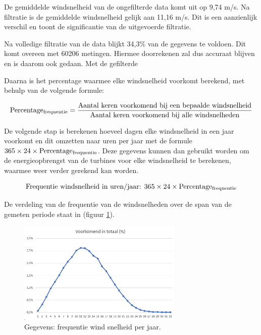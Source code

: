 De gemiddelde windsnelheid van de ongefilterde data komt uit op 9,74 m/s. Na filtratie is de gemiddelde windsnelheid gelijk aan 11,16 m/s. Dit is een aanzienlijk verschil en toont de significantie van de uitgevoerde filtratie.

Na volledige filtratie van de data blijkt 34,3\% van de gegevens te voldoen. Dit komt overeen met 60206 metingen. Hiermee doorrekenen zal dus accuraat blijven en is daarom ook gedaan. Met de gefilterde 

Daarna is het percentage waarmee elke windsnelheid voorkomt berekend, met behulp van de volgende formule:

\[
\text{Percentage\textsubscript{frequentie}} = \frac{\text{Aantal keren voorkomend bij een bepaalde windsnelheid}}{\text{Aantal keren voorkomend bij alle windsnelheden}}
\]

De volgende stap is berekenen hoeveel dagen elke windsnelheid in een jaar voorkomt en dit omzetten naar uren per jaar met de formule \(365 \times 24 \times \text{Percentage\textsubscript{frequentie}}\). Deze gegevens kunnen dan gebruikt worden om de energieopbrengst van de turbines voor elke windsnelheid te berekenen, waarmee weer verder gerekend kan worden.


\begin{equation} \label{eq:7}
\text{Frequentie windsnelheid in uren/jaar: } 365\times 24\times \text{Percentage\textsubscript{frequentie}}
\end{equation}


De verdeling van de frequentie van de windsnelheden over de span van de gemeten periode\cite{WindData} staat in (figuur \ref{fig:Windfrequentie}).
\begin{figure}[H]
\centering
\includegraphics[width=0.7\textwidth]{IMG/data/overzicht/Windfrequentie.png}
\caption{Gegevens: frequentie wind snelheid per jaar.}
\label{fig:Windfrequentie}
\end{figure}

